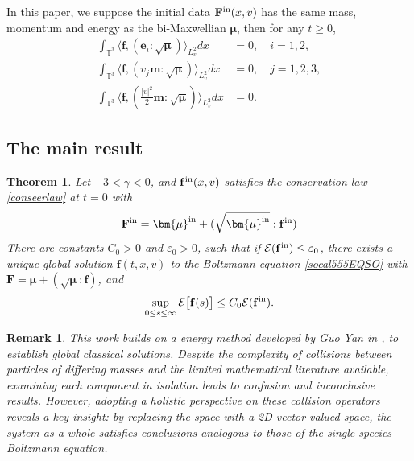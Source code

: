 \documentclass[reqno]{amsart}
\numberwithin{equation}{section}
\newtheorem{remark}[theorem]{Remark}
\numberwithin{equation}{section}
\newtheorem{thm}{Theorem}[section]
\begin{document}
In this paper, we suppose the initial data $\mathbf{F}^{\rm{in}}(x,v)$ has the same mass, momentum and energy as the bi-Maxwellian $\bm{\mu}$, then for any $t\geq0$,
\begin{equation}\label{conseerlaw}
\begin{aligned}
	 \int_{\mathbb{T}^3} \big\langle \mathbf{f}, (\mathbf{e}_i:\sqrt{\bm{\mu}}) \big\rangle_{L_v^2}  dx  &= 0, \quad i=1,2,\\
	 \int_{\mathbb{T}^3} \big\langle \mathbf{f}, (v_j \mathbf{m}:\sqrt{\bm{\mu}}) \big\rangle_{L_v^2} dx &= 0, \quad j=1,2,3,\\
	 \int_{\mathbb{T}^3} \big\langle \mathbf{f}, (\frac{|v|^2}{2}\mathbf{m} :\sqrt{\bm{\mu}})  \big\rangle_{L_v^2}dx &= 0.
\end{aligned}
\end{equation}




\subsection{The main result}


\begin{thm}\label{maintheorem11}
	Let $-3 < \gamma < 0$, and $\mathbf{f}^{\rm{in}}(x,v)$ satisfies the conservation law \eqref{conseerlaw} at $t = 0$ with
	\begin{equation*}
		\mathbf{F}^{\rm{in}}=\bm{\mu}^{\rm{in}}+(\sqrt{\bm{\mu}^{\rm{in}}}:\mathbf{f}^{\rm{in}})
	\end{equation*}
	 There are constants $C_0 > 0$ and $\varepsilon_0 > 0$, such that if $\mathcal{E}(\mathbf{f}^{\rm{in}}) \leq \varepsilon_0$, there exists a unique global solution $\mathbf{f}(t,x,v)$ to the Boltzmann equation \eqref{socal555EQSO} with $\mathbf{F}=\bm{\mu}+(\sqrt{\bm{\mu}}:\mathbf{f})$, and
	$$
	\sup_{0 \leq s \leq \infty} \mathcal{E}\big[\mathbf{f}(s)\big] \leq C_0\mathcal{E}(\mathbf{f}^{\rm{in}}).
	$$
\end{thm}
\begin{remark}
	‌This work builds on a energy method developed  by Guo Yan in \cite{[ivR]Guo2002},\cite{[impvR]Guo2003} to establish global classical solutions.  
	Despite the complexity of collisions between particles of differing masses and the limited mathematical literature available, examining each component in isolation leads to confusion and inconclusive results. However, adopting a holistic perspective on these collision operators reveals a key insight: by replacing the 
	space with a ‌2D vector-valued 
	space‌, the system as a whole satisfies conclusions analogous to those of the single-species Boltzmann equation.
\end{remark}
\end{document}

